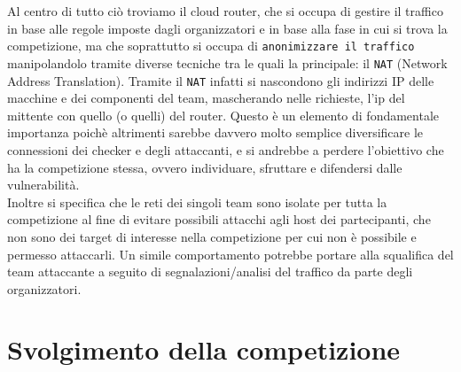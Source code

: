 Al centro di tutto ciò troviamo il cloud router, che si occupa di gestire il traffico in base alle regole imposte dagli organizzatori e in base alla fase in cui si trova la competizione,
ma che soprattutto si occupa di \texttt{anonimizzare il traffico} manipolandolo tramite diverse tecniche tra le quali la principale: il \texttt{NAT} (Network Address Translation).
Tramite il \texttt{NAT} infatti si nascondono gli indirizzi IP delle macchine e dei componenti del team, mascherando nelle richieste, l'ip del mittente con quello (o quelli) del router.
Questo è un elemento di fondamentale importanza poichè altrimenti sarebbe davvero molto semplice diversificare le connessioni dei checker e degli attaccanti, e si andrebbe a perdere l'obiettivo che ha
la competizione stessa, ovvero individuare, sfruttare e difendersi dalle vulnerabilità.\\

Inoltre si specifica che le reti dei singoli team sono isolate per tutta la competizione al fine di evitare possibili attacchi agli host dei partecipanti,
che non sono dei target di interesse nella competizione per cui non è possibile e permesso attaccarli.
Un simile comportamento potrebbe portare alla squalifica del team attaccante a seguito di segnalazioni/analisi del traffico da parte degli organizzatori.

\section{Svolgimento della competizione}


